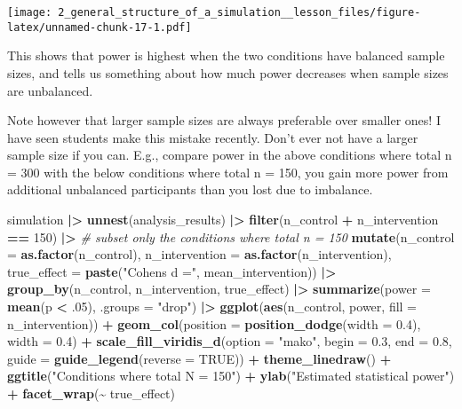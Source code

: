 \documentclass[
]{article}
\newenvironment{Shaded}{\begin{snugshade}}{\end{snugshade}}
\newcommand{\AttributeTok}[1]{\textcolor[rgb]{0.13,0.29,0.53}{#1}}
\newcommand{\CommentTok}[1]{\textcolor[rgb]{0.56,0.35,0.01}{\textit{#1}}}
\newcommand{\ConstantTok}[1]{\textcolor[rgb]{0.56,0.35,0.01}{#1}}
\newcommand{\DecValTok}[1]{\textcolor[rgb]{0.00,0.00,0.81}{#1}}
\newcommand{\FloatTok}[1]{\textcolor[rgb]{0.00,0.00,0.81}{#1}}
\newcommand{\FunctionTok}[1]{\textcolor[rgb]{0.13,0.29,0.53}{\textbf{#1}}}
\newcommand{\NormalTok}[1]{#1}
\newcommand{\SpecialCharTok}[1]{\textcolor[rgb]{0.81,0.36,0.00}{\textbf{#1}}}
\newcommand{\StringTok}[1]{\textcolor[rgb]{0.31,0.60,0.02}{#1}}
\begin{document}
\texttt{[image: 2\_general\_structure\_of\_a\_simulation\_\_lesson\_files/figure-latex/unnamed-chunk-17-1.pdf]}

This shows that power is highest when the two conditions have balanced
sample sizes, and tells us something about how much power decreases when
sample sizes are unbalanced.

Note however that larger sample sizes are always preferable over smaller
ones! I have seen students make this mistake recently. Don't ever not
have a larger sample size if you can. E.g., compare power in the above
conditions where total n = 300 with the below conditions where total n =
150, you gain more power from additional unbalanced participants than
you lost due to imbalance.

\begin{Shaded}
\begin{Highlighting}[]
\NormalTok{simulation }\SpecialCharTok{|\textgreater{}}
  \FunctionTok{unnest}\NormalTok{(analysis\_results) }\SpecialCharTok{|\textgreater{}}
  \FunctionTok{filter}\NormalTok{(n\_control }\SpecialCharTok{+}\NormalTok{ n\_intervention }\SpecialCharTok{==} \DecValTok{150}\NormalTok{) }\SpecialCharTok{|\textgreater{}} \CommentTok{\# subset only the conditions where total n = 150}
  \FunctionTok{mutate}\NormalTok{(}\AttributeTok{n\_control =} \FunctionTok{as.factor}\NormalTok{(n\_control),}
         \AttributeTok{n\_intervention =} \FunctionTok{as.factor}\NormalTok{(n\_intervention),}
         \AttributeTok{true\_effect =} \FunctionTok{paste}\NormalTok{(}\StringTok{"Cohen\textquotesingle{}s d ="}\NormalTok{, mean\_intervention)) }\SpecialCharTok{|\textgreater{}}
  \FunctionTok{group\_by}\NormalTok{(n\_control,}
\NormalTok{           n\_intervention,}
\NormalTok{           true\_effect) }\SpecialCharTok{|\textgreater{}}
  \FunctionTok{summarize}\NormalTok{(}\AttributeTok{power =} \FunctionTok{mean}\NormalTok{(p }\SpecialCharTok{\textless{}}\NormalTok{ .}\DecValTok{05}\NormalTok{), }\AttributeTok{.groups =} \StringTok{"drop"}\NormalTok{) }\SpecialCharTok{|\textgreater{}}
  \FunctionTok{ggplot}\NormalTok{(}\FunctionTok{aes}\NormalTok{(n\_control, power, }\AttributeTok{fill =}\NormalTok{ n\_intervention)) }\SpecialCharTok{+}
  \FunctionTok{geom\_col}\NormalTok{(}\AttributeTok{position =} \FunctionTok{position\_dodge}\NormalTok{(}\AttributeTok{width =} \FloatTok{0.4}\NormalTok{), }\AttributeTok{width =} \FloatTok{0.4}\NormalTok{) }\SpecialCharTok{+}
  \FunctionTok{scale\_fill\_viridis\_d}\NormalTok{(}\AttributeTok{option =} \StringTok{"mako"}\NormalTok{, }\AttributeTok{begin =} \FloatTok{0.3}\NormalTok{, }\AttributeTok{end =} \FloatTok{0.8}\NormalTok{,}
                       \AttributeTok{guide =} \FunctionTok{guide\_legend}\NormalTok{(}\AttributeTok{reverse =} \ConstantTok{TRUE}\NormalTok{)) }\SpecialCharTok{+}
  \FunctionTok{theme\_linedraw}\NormalTok{() }\SpecialCharTok{+}
  \FunctionTok{ggtitle}\NormalTok{(}\StringTok{"Conditions where total N = 150"}\NormalTok{) }\SpecialCharTok{+}
  \FunctionTok{ylab}\NormalTok{(}\StringTok{"Estimated statistical power"}\NormalTok{) }\SpecialCharTok{+}
  \FunctionTok{facet\_wrap}\NormalTok{(}\SpecialCharTok{\textasciitilde{}}\NormalTok{ true\_effect)}
\end{Highlighting}
\end{Shaded}
\end{document}
